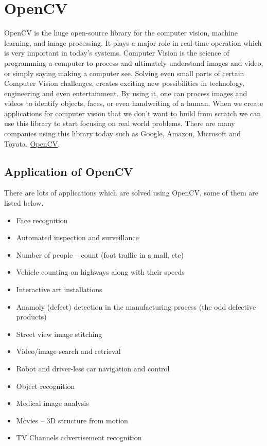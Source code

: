 \section{OpenCV}

OpenCV is the huge open-source library for the computer vision, machine learning, and image processing. It plays a major role in real-time operation which is very important in today's systems. Computer Vision is the science of programming a computer to process and ultimately understand images and video, or simply saying making a computer see. Solving even small parts of certain Computer Vision challenges, creates exciting new possibilities in technology, engineering and even entertainment. By using it, one can process images and videos to identify objects, faces, or even handwriting of a human.  When we create applications for computer vision that we don’t want to build from scratch we can use this library to start focusing on real world problems. There are many companies using this library today such as Google, Amazon, Microsoft and Toyota. \href{https://bit.ly/3a9ozVO}{OpenCV}.

\subsection{Application of OpenCV}

There are lots of applications which are solved using OpenCV, some of them are listed below.
\begin{itemize}
	\item Face recognition
	\item Automated inspection and surveillance
	\item Number of people – count (foot traffic in a mall, etc)
	\item Vehicle counting on highways along with their speeds
	\item Interactive art installations
	\item Anamoly (defect) detection in the manufacturing process (the odd defective products)
	\item Street view image stitching
	\item Video/image search and retrieval
	\item Robot and driver-less car navigation and control
	\item Object recognition
	\item Medical image analysis
	\item Movies – 3D structure from motion
	\item TV Channels advertisement recognition
\end{itemize}


